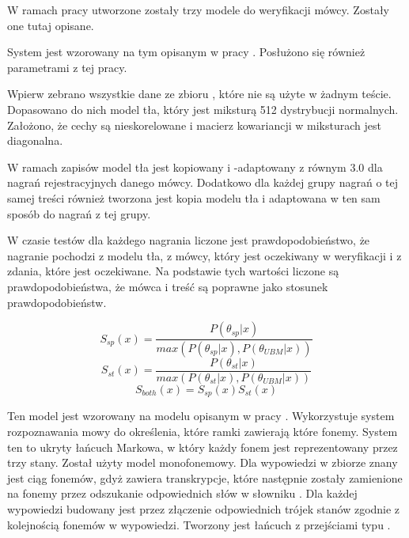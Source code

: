 W ramach pracy utworzone zostały trzy modele do weryfikacji mówcy. Zostały one tutaj opisane.

\label{sec:gmm_ubm}

System  jest wzorowany na tym opisanym w pracy \cite{utteranceVerificationFor}. Posłużono
się również parametrami z tej pracy.

Wpierw zebrano wszystkie dane ze zbioru , które nie są użyte w żadnym teście. Dopasowano
do nich model tła, który jest miksturą 512 dystrybucji normalnych. Założono, że cechy są nieskorelowane
i macierz kowariancji w miksturach jest diagonalna.

W ramach zapisów model tła jest kopiowany i -adaptowany z  równym $3.0$
dla nagrań rejestracyjnych danego mówcy. Dodatkowo dla każdej grupy nagrań o tej samej treści również tworzona
jest kopia modelu tła i  adaptowana w ten sam sposób do nagrań z tej grupy.

W czasie testów dla każdego nagrania liczone jest prawdopodobieństwo, że nagranie pochodzi z modelu tła,
z  mówcy, który jest oczekiwany w weryfikacji i z  zdania, które jest oczekiwane.
Na podstawie tych wartości liczone są prawdopodobieństwa, że mówca i treść są poprawne jako stosunek prawdopodobieństw.

$$S_{sp}(x) = \frac{P(\theta_{sp} | x)}{max(P(\theta_{sp} | x), P(\theta_{UBM} | x))}$$
$$S_{st}(x) = \frac{P(\theta_{st} | x)}{max(P(\theta_{st} | x), P(\theta_{UBM} | x))}$$
$$S_{both}(x) = S_{sp}(x) S_{st}(x)$$

\label{sec:hmm_gmm}

Ten model jest wzorowany na modelu opisanym w pracy \cite{comparisonOfMultiple}. Wykorzystuje
system rozpoznawania mowy do określenia, które ramki zawierają które fonemy. System ten
to ukryty łańcuch Markowa, w który każdy fonem jest reprezentowany przez trzy stany. Został
użyty model monofonemowy. Dla wypowiedzi w zbiorze znany jest ciąg fonemów, gdyż
 zawiera transkrypcje, które następnie zostały zamienione na fonemy
przez odszukanie odpowiednich słów w słowniku . Dla każdej wypowiedzi
budowany jest  przez złączenie odpowiednich trójek stanów zgodnie z kolejnością
fonemów w wypowiedzi. Tworzony jest łańcuch z przejściami typu .

